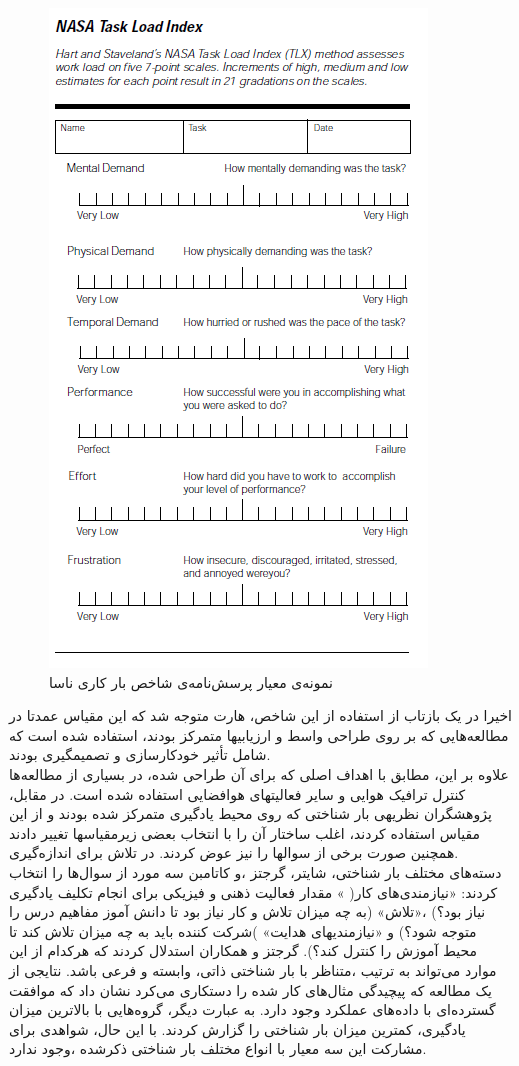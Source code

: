 \begin{figure}[htbp]
	\centering
	\includegraphics[width=0.7\linewidth]{figures/NasaTLX}
	\caption[پرسش نامه‌ی شاخص بار کاری ناسا]{نمونه‌ی معیار پرسش‌نامه‌ی شاخص بار کاری ناسا}
	\label{fig:nasatlx}
\end{figure}

اخيرا در یک بازتاب از استفاده از این شاخص، هارت متوجه شد كه این مقياس عمدتا در مطالعه‌هایی كه 
بر روی طراحی واسط  و  ارزیابیها متمركز  بودند، استفاده  شده  است  كه  شامل  تأثير خودكارسازی و 
تصميمگيری بودند.
\cite{hart2006nasa}
\\
علاوه بر این، مطابق با اهداف اصلی كه برای آن طراحی شده، در بسياری از مطالعه‌ها كنترل ترافيک
هوایی و سایر فعاليتهای هوافضایی استفاده شده است. در مقابل، پژوهشگران نظریهی بار شناختی كه 
روی محيط یادگيری متمركز شده بودند و از این مقياس استفاده كردند، اغلب ساختار آن را با انتخاب 
بعضی زیرمقياسها تغيير دادند .همچنين صورت برخی از سوالها را نيز عوض كردند.
\cite{antonenko2010using}
در تلاش برای
اندازه‌گيری دسته‌های مختلف بار شناختی، شایتر، گرجتز ،و كاتامبن سه مورد از سوال‌ها را انتخاب كردند:
«نيازمندی‌های كار( »
مقدار فعاليت ذهنی و فيزیکی برای انجام تکليف یادگيری نياز بود؟) ،«تلاش» (به 
چه ميزان تلاش و كار نياز بود تا دانش آموز مفاهيم درس را متوجه شود؟) و «نيازمندیهای هدایت»
)شركت كننده باید به چه ميزان تلاش كند تا محيط آموزش را كنترل كند؟). گرجتز و همکاران استدلال 
كردند كه هركدام از این موارد می‌تواند به ترتيب ،متناظر با بار شناختی ذاتی، وابسته و فرعی باشد. نتایجی
از یک مطالعه كه پيچيدگی مثال‌های كار شده را دستكاری می‌كرد نشان داد كه موافقت گسترده‌ای با 
داده‌های عملکرد وجود دارد. به عبارت دیگر، گروه‌هایی با بالاترین ميزان یادگيری، كمترین ميزان بار 
شناختی را گزارش كردند. با این حال، شواهدی برای مشاركت این سه معيار با انواع مختلف بار شناختی
ذكرشده ،وجود ندارد.
\cite{gerjets2006can}
\\
